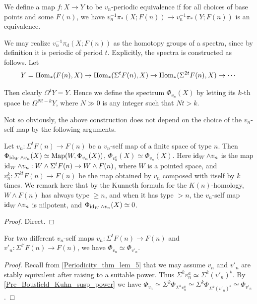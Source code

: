 	\begin{defn}\label{Periodic_equiv}
		We define a map $f:X\to Y$ to be $v_n$-periodic equivalence if for all choices of base points and some $F(n)$, we have $v_n^{-1}\pi_*(X;F(n))\to v_n^{-1}\pi_*(Y;F(n))$ is an equivalence. 
	\end{defn}

	\begin{const}\label{Pre_Bousfield_Kuhn_fun}
		We may realize $v_n^{-1}\pi_d(X;F(n))$ as the homotopy groups of a spectra, since by definition it is periodic of period $t$. Explicitly, the spectra is constructed as follows. Let 
		\[ Y=\operatorname{\mathrm{Hom}}_*(F(n),X)\to\operatorname{\mathrm{Hom}}_*(\Sigma^tF(n),X)\to\operatorname{\mathrm{Hom}}_*(\Sigma^{2t}F(n),X)\to\cdots \]

		Then clearly $\Omega^tY=Y$. Hence we define the spectrum $\Phi_{v_n}(X)$ by letting its $k$-th space be $\Omega^{Nt-k}Y$, where $N\gg0$ is any integer such that $Nt>k$. 
	\end{const}

	Not so obviously, the above construction does not depend on the choice of the $v_n$-self map by the following arguments. 

	\begin{lemma}\label{Pre_Bousfield_Kuhn_susp_power}
		Let $v_n:\Sigma^tF(n)\to F(n)$ be a $v_n$-self map of a finite space of type $n$. Then $\Phi_{\operatorname{\mathrm{id}}_W\wedge v_n}(X)\simeq\operatorname{\mathrm{Map}}(W,\Phi_{v_n}(X))$, $\Phi_{v_n^k}(X)\simeq\Phi_{v_n}(X)$. Here $\operatorname{\mathrm{id}}_W\wedge v_n$ is the map $\operatorname{\mathrm{id}}_W\wedge v_n:W\wedge\Sigma^tF(n)\to W\wedge F(n)$, where $W$ is a pointed space, and $v_n^k:\Sigma^{kt}F(n)\to F(n)$ be the map obtained by $v_n$ composed with itself by $k$ times. We remark here that by the Kunneth formula for the $K(n)$-homology, $W\wedge F(n)$ has always type $\geq n$, and when it has type $>n$, the $v_n$-self map $\operatorname{\mathrm{id}}_W\wedge v_n$ is nilpotent, and $\Phi_{\operatorname{\mathrm{id}}_W\wedge v_n}(X)\simeq0$. 
	\end{lemma}
	\begin{proof}
		Direct. 
	\end{proof}

	\begin{coro}\label{Pre_Bousfield_Kuhn_unique}
		For two different $v_n$-self maps $v_n:\Sigma^tF(n)\to F(n)$ and $v'_n:\Sigma^{t'}F(n)\to F(n)$, we have $\Phi_{v_n}\simeq\Phi_{v'_n}$. 
	\end{coro}
	\begin{proof}
		Recall from \cref{Periodicity_thm_lem_5} that we may assume $v_n$ and $v'_n$ are stably equivalent after raising to a suitable power. Thus $\Sigma^kv_n^a\simeq\Sigma^k(v'_n)^b$. By \cref{Pre_Bousfield_Kuhn_susp_power} we have $\Phi_{v_n}\simeq\Sigma^k\Phi_{\Sigma^kv_n^a}\simeq\Sigma^k\Phi_{\Sigma^k(v'_n)^b}\simeq\Phi_{v'_n}$. 
	\end{proof}

